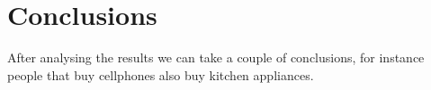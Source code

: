 \section{Conclusions}
\label{conclusions}

After analysing the results we can take a couple of conclusions, for instance people that buy cellphones also
buy kitchen appliances.